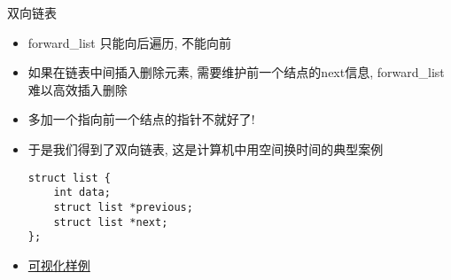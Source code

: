 \begin{frame}[fragile]{双向链表}
    \begin{itemize}[<+- | alert@+>]
        \item forward\_list 只能向后遍历, 不能向前
        \item 如果在链表中间插入删除元素, 需要维护前一个结点的next信息, forward\_list 难以高效插入删除
        \item 多加一个指向前一个结点的指针不就好了!
        \item 于是我们得到了双向链表, 这是计算机中用空间换时间的典型案例
        \begin{verbatim}
struct list {
    int data;
    struct list *previous;
    struct list *next;
};
        \end{verbatim}
        \item \href{http://pythontutor.com/c.html#code=\%23include\%20\%3Cstdio.h\%3E\%0A\%23include\%20\%3Cstdlib.h\%3E\%0A\%0Astruct\%20list\%20\%7B\%0A\%20\%20int\%20data\%3B\%0A\%20\%20struct\%20list\%20*previous\%3B\%0A\%20\%20struct\%20list\%20*next\%3B\%0A\%7D\%20_head,\%20*head\%20\%3D\%20\%26_head,\%20*tail\%20\%3D\%20\%26_head\%3B\%0A\%0Atypedef\%20struct\%20list\%20list\%3B\%0A\%0Avoid\%20insert_node\%28list\%20*p,\%20int\%20data\%29\%20\%7B\%0A\%20\%20list\%20*node\%20\%3D\%20\%28list\%20*\%29malloc\%28sizeof\%28list\%29\%29\%3B\%0A\%20\%20node-\%3Edata\%20\%3D\%20data\%3B\%0A\%20\%20node-\%3Eprevious\%20\%3D\%20p\%3B\%0A\%20\%20node-\%3Enext\%20\%3D\%20p-\%3Enext\%3B\%0A\%20\%20if\%20\%28p-\%3Enext\%29\%0A\%20\%20\%20\%20p-\%3Enext-\%3Eprevious\%20\%3D\%20node\%3B\%0A\%20\%20else\%0A\%20\%20\%20\%20tail\%20\%3D\%20node\%3B\%0A\%20\%20p-\%3Enext\%20\%3D\%20node\%3B\%0A\%7D\%0A\%0Avoid\%20delete_node\%28list\%20*p\%29\%20\%7B\%0A\%20\%20p-\%3Eprevious-\%3Enext\%20\%3D\%20p-\%3Enext\%3B\%0A\%20\%20if\%20\%28p-\%3Enext\%29\%0A\%20\%20\%20\%20p-\%3Enext-\%3Eprevious\%20\%3D\%20p-\%3Eprevious\%3B\%0A\%20\%20else\%0A\%20\%20\%20\%20tail\%20\%3D\%20p-\%3Eprevious\%3B\%0A\%20\%20free\%28p\%29\%3B\%0A\%7D\%0A\%0Aint\%20main\%28\%29\%20\%7B\%0A\%20\%20for\%20\%28int\%20i\%20\%3D\%200\%3B\%20i\%20\%3C\%203\%3B\%20\%2B\%2Bi\%29\%0A\%20\%20\%20\%20insert_node\%28tail,\%20i\%29\%3B\%0A\%20\%20for\%20\%28list\%20*p\%20\%3D\%20head-\%3Enext\%3B\%20p\%20!\%3D\%20NULL\%3B\%20p\%20\%3D\%20p-\%3Enext\%29\%0A\%20\%20\%20\%20printf\%28\%22\%25d\%5Cn\%22,\%20p-\%3Edata\%29\%3B\%0A\%20\%20delete_node\%28head-\%3Enext-\%3Enext\%29\%3B\%0A\%20\%20delete_node\%28tail\%29\%3B\%0A\%20\%20delete_node\%28head-\%3Enext\%29\%3B\%0A\%7D\%0A&mode=edit&origin=opt-frontend.js&py=c&rawInputLstJSON=\%5B\%5D}{可视化样例}
    \end{itemize}
\end{frame}